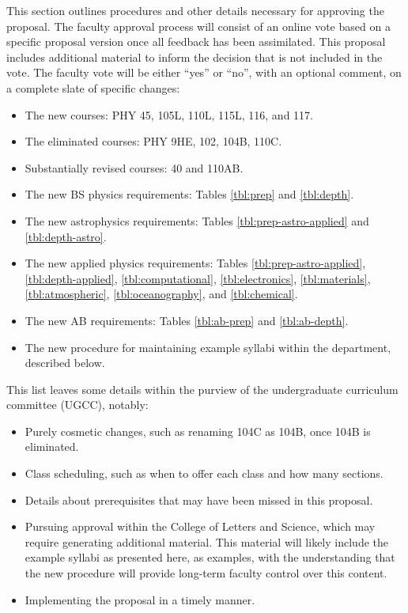 \documentclass[12pt]{article}
\begin{document}
This section outlines procedures and other details necessary for
approving the proposal.  The faculty approval process will consist of
an online vote based on a specific proposal version once all feedback
has been assimilated.  This proposal includes additional material to
inform the decision that is not included in the vote.  The faculty
vote will be either ``yes'' or ``no'', with an optional comment, on a
complete slate of specific changes:
\begin{itemize}
 \item The new courses: PHY 45, 105L, 110L, 115L, 116, and 117.
 \item The eliminated courses:  PHY 9HE, 102, 104B, 110C.
 \item Substantially revised courses: 40 and 110AB.
 \item The new BS physics requirements: Tables \ref{tbl:prep} and \ref{tbl:depth}.
 \item The new astrophysics requirements: Tables \ref{tbl:prep-astro-applied} and \ref{tbl:depth-astro}.   
 \item The new applied physics requirements: Tables \ref{tbl:prep-astro-applied}, \ref{tbl:depth-applied},
\ref{tbl:computational}, \ref{tbl:electronics}, \ref{tbl:materials}, \ref{tbl:atmospheric}, \ref{tbl:oceanography}, and \ref{tbl:chemical}.   
 \item The new AB requirements: Tables \ref{tbl:ab-prep} and \ref{tbl:ab-depth}.
 \item The new procedure for maintaining example syllabi within the department, described below.
\end{itemize}
This list leaves some details within the purview of the undergraduate
curriculum committee (UGCC), notably:
\begin{itemize}
 \item Purely cosmetic changes, such as renaming 104C as 104B, once 104B is eliminated.
 \item Class scheduling, such as when to offer each class and how many sections.
 \item Details about prerequisites that may have been missed in this proposal.
 \item Pursuing approval within the College of Letters and Science, which may require
   generating additional material.  This material will likely include
   the example syllabi as presented here, as examples, with the
   understanding that the new procedure will provide long-term faculty
   control over this content.
 \item Implementing the proposal in a timely manner.
\end{itemize}
\end{document}
